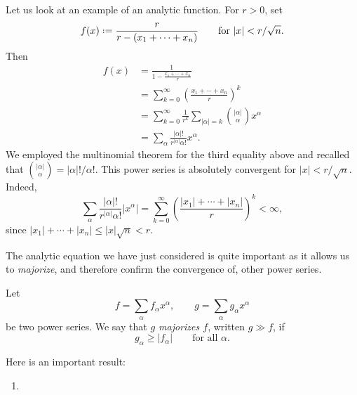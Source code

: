 \begin{example}
  Let us look at an example of an analytic function. For \(r>0\), set
  \[
    f(x)\defeq \frac{r}{r-(x_1+\dotsm+x_n)}
    \qquad
    \text{for \(|x|<r/\sqrt{n}\).}
  \]
  Then
  \begin{align*}
    f(x)
    &=\frac{1}{\displaystyle 1-\frac{x_1+\dotsb+x_n}{r}}\\
    &=\sum_{k=0}^\infty\left(\frac{x_1+\dotsb+x_n}{r}\right)^k\\
    &=\sum_{k=0}^\infty\frac{1}{r^k}\sum_{|\alpha|=k}\binom{|\alpha|}{\alpha}x^\alpha\\
    &=\sum_\alpha\frac{|\alpha|!}{r^{|\alpha|}\alpha!}x^\alpha.
  \end{align*}
  We employed the multinomial theorem for the third equality above and
  recalled that \(\binom{|\alpha|}{\alpha}=|\alpha|!/\alpha!\). This power
  series is absolutely convergent for \(|x|<r/\sqrt{n}\). Indeed,
  \[
    \sum_\alpha\frac{|\alpha|!}{r^{|\alpha|}{\alpha!}}|x^\alpha|
    =\sum_{k=0}^\infty\left(\frac{|x_1|+\dotsb+|x_n|}{r}\right)^k<\infty,
  \]
  since \(|x_1|+\dotsb+|x_n|\leq |x|\sqrt{n}<r\).
\end{example}

The analytic equation we have just considered is quite important as it
allows us to \emph{majorize}, and therefore confirm the convergence of,
other power series.

\begin{definition}
  Let
  \[
    f=\sum_\alpha f_\alpha x^\alpha,\qquad g=\sum_\alpha g_\alpha x^\alpha
  \]
  be two power series. We say that \emph{\(g\) majorizes \(f\)}, written
  \(g\gg f\), if
  \[
    g_\alpha\geq |f_\alpha|\qquad\text{for all \(\alpha\).}
  \]
\end{definition}

Here is an important result:
\begin{lemma}[Majorants]
  \hfill
  \begin{enumerate}[label=(\roman*),noitemsep]
  \item
  \end{enumerate}
\end{lemma}

